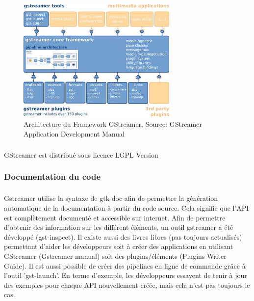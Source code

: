 \begin{figure}

  \begin{center}

    \includegraphics[width=0.70\textwidth]{images/gstoverview}

  \end{center}

  \caption{Architecture du Framework GStreamer, Source: GStreamer
  Application Development Manual}

  \label{Yes}

\end{figure}

\subparagraph{}

GStreamer est distribué sous licence LGPL Version

\subsubsection{Documentation du code}

\subparagraph{} Gstreamer utilise la syntaxe de gtk-doc afin de
permettre la génération automatique de la documentation à partir du
code source. Cela signifie que l'API est complètement documenté et
accessible sur internet. Afin de permettre d'obtenir des information
sur les différent éléments, un outil gstreamer a été développé
(gst-inspect). Il existe aussi des livres libres (pas toujours
actualisés) permettant d'aider les développeurs soit à créer
des applications en utilisant GStreamer (Gstreamer manual) soit des
plugins/éléments (Plugins Writer Guide). Il est aussi possible de créer
des pipelines en ligne de commande grâce à l'outil 'gst-launch'. En terme
d'exemple, les développeurs essayent de tenir à jour des exemples pour
chaque API nouvellement créée, mais cela n'est pas toujours le cas.

